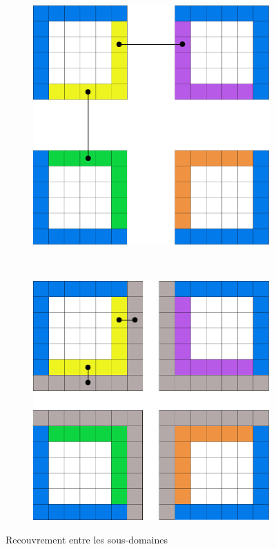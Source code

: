 \begin{figure}[!ht]
  \centering
  \begin{subfigure}[b]{0.5\textwidth}
    \centering
    \includegraphics[scale=0.15]{figures/depdomain.png}
  \caption{\label{fig:dependencies} }
  \end{subfigure}%
  ~
  \begin{subfigure}[b]{0.5\textwidth}
    \centering
    \includegraphics[scale=0.15]{figures/depdomain-overlap.png}
  \caption{\label{fig:depdomover} }	
  \end{subfigure}
  \caption{\label{fig:domdep}Recouvrement entre les sous-domaines}
\end{figure}




